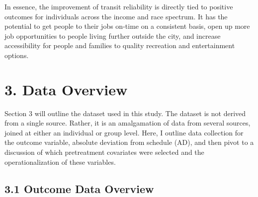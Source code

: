 \documentclass[
  12pt,
]{article}
\begin{document}
In essence, the improvement of transit reliability is directly tied to
positive outcomes for individuals across the income and race spectrum.
It has the potential to get people to their jobs on-time on a consistent
basis, open up more job opportunities to people living further outside
the city, and increase accessibility for people and families to quality
recreation and entertainment options.

\section{3. Data Overview}\label{data-overview}

Section 3 will outline the dataset used in this study. The dataset is
not derived from a single source. Rather, it is an amalgamation of data
from several sources, joined at either an individual or group level.
Here, I outline data collection for the outcome variable, absolute
deviation from schedule (AD), and then pivot to a discussion of which
pretreatment covariates were selected and the operationalization of
these variables.

\subsection{3.1 Outcome Data Overview}\label{outcome-data-overview}
\end{document}
